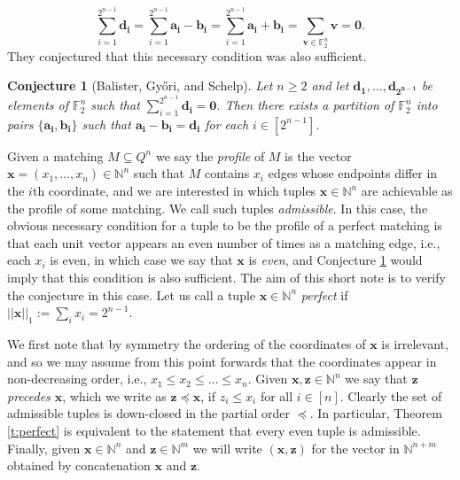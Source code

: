 \documentclass{article}
\newtheorem{conjecture}[theorem]{Conjecture}
\begin{document}
\begin{equation}\label{e:null}
\sum_{i=1}^{2^{n-1}} \bm{d_i} = \sum_{i=1}^{2^{n-1}}  \bm{a_i} - \bm{b_i} =   \sum_{i=1}^{2^{n-1}}  \bm{a_i} + \bm{b_i} = \sum_{\bm{v} \in \mathbb{F}_2^n} \bm{v} = \bm{0}.
\end{equation}
They conjectured that this necessary condition was also sufficient.
\begin{conjecture}[Balister, Gy{\H{o}}ri, and Schelp]\label{c:BGS}
Let $n \geq 2$ and let $\bm{d_1},\ldots, \bm{d_{2^{n-1}}}$ be elements of $\mathbb{F}_2^n$ such that $\sum_{i=1}^{2^{n-1}} \bm{d_i} = \bm{0}$. Then there exists a partition of $\mathbb{F}_2^n$ into pairs $\{\bm{a_i},\bm{b_i}\}$ such that $\bm{a_i} - \bm{b_i} = \bm{d_i}$ for each $i \in \left[2^{n-1}\right]$.
\end{conjecture}

Given a matching $M \subseteq Q^n$ we say the \emph{profile} of $M$ is the vector $\bm{x}=(x_1,\ldots, x_n) \in \mathbb{N}^n$ such that $M$ contains $x_i$ edges whose endpoints differ in the $i$th coordinate, and we are interested in which tuples $\bm{x} \in \mathbb{N}^n$ are achievable as the profile of some matching. We call such tuples \emph{admissible}. In this case, the obvious necessary condition for a tuple to be the profile of a perfect matching is that each unit vector appears an even number of times as a matching edge, i.e., each $x_i$ is even, in which case we say that $\bm{x}$ is \emph{even}, and Conjecture \ref{c:BGS} would imply that this condition is also sufficient. The aim of this short note is to verify the conjecture in this case. Let us call a tuple $\bm{x} \in \mathbb{N}^n$  \emph{perfect} if $||\bm{x}||_1 := \sum_i x_i = 2^{n-1}$.

We first note that by symmetry the ordering of the coordinates of $\bm{x}$ is irrelevant, and so we may assume from this point forwards that the coordinates appear in non-decreasing order, i.e., $x_1 \leq x_2 \leq \ldots \leq x_n$. Given $\bm{x},\bm{z} \in \mathbb{N}^{n}$ we say that \emph{$\bm{z}$ precedes $\bm{x}$}, which we write as $\bm{z} \preceq \bm{x}$, if $z_i \leq x_i$ for all $i \in [n]$. Clearly the set of admissible tuples is down-closed in the partial order $\preceq$. In particular, Theorem \ref{t:perfect} is equivalent to the statement that every even tuple is admissible. Finally, given $\bm{x} \in \mathbb{N}^{n}$ and $\bm{z} \in \mathbb{N}^{m}$ we will write $(\bm{x},\bm{z})$ for the vector in $\mathbb{N}^{n+m}$ obtained by concatenation $\bm{x}$ and $\bm{z}$.
\end{document}
